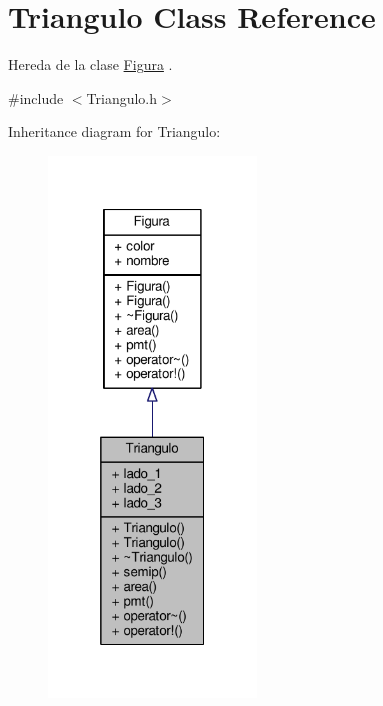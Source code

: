 \hypertarget{class_triangulo}{\section{Triangulo Class Reference}
\label{class_triangulo}
}


Hereda de la clase \hyperlink{class_figura}{Figura} .  




{\ttfamily \#include $<$Triangulo.\+h$>$}



Inheritance diagram for Triangulo\+:\nopagebreak
\begin{figure}[H]
\begin{center}
\leavevmode
\includegraphics[width=157pt]{class_triangulo__inherit__graph}
\end{center}
\end{figure}
